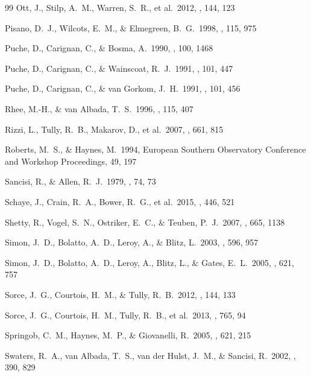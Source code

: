 \documentclass[usenatbib,useAMS]{mnras}
\begin{document}
\begin{thebibliography}{99}
 Ott, J., Stilp, A.~M., 
Warren, S.~R., et al.\ 2012, \aj, 144, 123 

 Pisano, D.~J., Wilcots, 
E.~M., \& Elmegreen, B.~G.\ 1998, \aj, 115, 975 

 Puche, D., Carignan, C., 
\& Bosma, A.\ 1990, \aj, 100, 1468 

 Puche, D., Carignan, C., 
\& Wainscoat, R.~J.\ 1991, \aj, 101, 447 

 Puche, D., Carignan, C., 
\& van Gorkom, J.~H.\ 1991, \aj, 101, 456 

 Rhee, M.-H., \& van Albada, T.~S.\ 1996, \aaps, 115, 407

 Rizzi, L., Tully, R.~B., 
Makarov, D., et al.\ 2007, \apj, 661, 815 

 Roberts, M.~S., \& Haynes, M.\ 1994, European Southern Observatory Conference and Workshop Proceedings, 49, 197

 Sancisi, R., \& Allen, R.~J.\ 1979, \aap, 74, 73 

 Schaye, J., Crain, 
R.~A., Bower, R.~G., et al.\ 2015, \mnras, 446, 521 

 Shetty, R., Vogel, 
S.~N., Ostriker, E.~C., \& Teuben, P.~J.\ 2007, \apj, 665, 1138 

 Simon, J.~D., Bolatto, 
A.~D., Leroy, A., \& Blitz, L.\ 2003, \apj, 596, 957 

 Simon, J.~D., Bolatto, 
A.~D., Leroy, A., Blitz, L., \& Gates, E.~L.\ 2005, \apj, 621, 757 

 Sorce, J.~G., Courtois, 
H.~M., \& Tully, R.~B.\ 2012, \aj, 144, 133 

 Sorce, J.~G., Courtois, 
H.~M., Tully, R.~B., et al.\ 2013, \apj, 765, 94 

 Springob, C.~M., Haynes, M.~P., \& Giovanelli, R.\ 2005, \apj, 621, 215 

 Swaters, R.~A., van Albada, T.~S., van der Hulst, J.~M., \& Sancisi, R.\ 2002, \aap, 390, 829 


\end{thebibliography}
\end{document}
